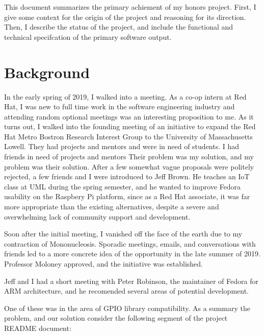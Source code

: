 \documentclass{article}
\begin{document}
This document summarizes
the primary achiement
of my honors project.
First, I give some context
for the origin of the project
and reasoning for its direction.
Then, I describe the status of the project,
and include the functional and technical specifcation
of the primary software output.

\section{Background}

In the early spring of 2019,
I walked into a meeting.
As a co-op intern at Red Hat,
I was new to full time work
in the software engineering industry
and attending random optional meetings
was an interesting proposition to me.
As it turns out,
I walked into the founding meeting
of an initiative to expand
the Red Hat Metro Bostron Research Interest Group
to the University of Massachusetts Lowell.
They had projects and mentors
and were in need of students.
I had friends in need
of projects and mentors
Their problem was my solution,
and my problem was their solution.
After a few somewhat vague proposals
were politely rejected,
a few friends and I were introduced to Jeff Brown.
He teaches an IoT class at UML during the spring semester,
and he wanted to improve Fedora usability
on the Raspbery Pi platform,
since as a Red Hat associate,
it was far more appropriate
than the existing alternatives,
despite a severe and overwhelming
lack of community support and development.

Soon after the initial meeting,
I vanished off the face of the earth
due to my contraction of Mononucleosis.
Sporadic meetings, emails, and conversations with friends
led to a more concrete idea of the opportunity
in the late summer of 2019.
Professor Moloney approved,
and the initiative was established.

Jeff and I had a short meeting
with Peter Robinson,
the maintainer of
Fedora for ARM architecture,
and he recomended several areas
of potential development.

One of these was in the area
of GPIO library compatibility.
As a summary the problem,
and our solution
consider the following segment
of the project README document:
\end{document}
